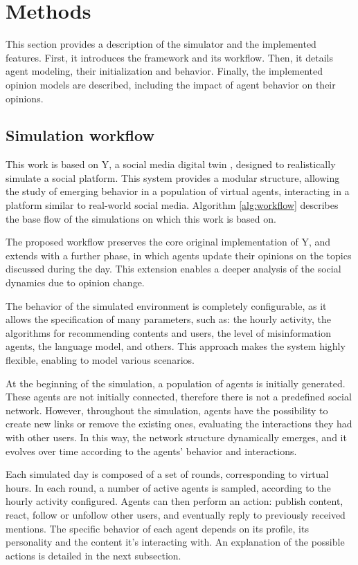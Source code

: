 \section{Methods}
\label{sec:methods}

This section provides a description of the simulator and the implemented features.
First, it introduces the framework and its workflow.
Then, it details agent modeling, their initialization and behavior.
Finally, the implemented opinion models are described, including the impact of agent behavior on their opinions.

\subsection{Simulation workflow}
This work is based on Y, a social media digital twin \cite{rossetti2024ysocialllmpoweredsocial}, designed to realistically simulate a social platform.
This system provides a modular structure, allowing the study of emerging behavior in a population of virtual agents, interacting in a platform similar to real-world social media.
Algorithm \ref{alg:workflow} describes the base flow of the simulations on which this work is based on.

\medskip
The proposed workflow preserves the core original implementation of Y, and extends with a further phase, in which agents update their opinions on the topics discussed during the day.
This extension enables a deeper analysis of the social dynamics due to opinion change.

The behavior of the simulated environment is completely configurable, as it allows the specification of many parameters, such as: the hourly activity, the algorithms for recommending contents and users, the level of misinformation agents, the language model, and others.
This approach makes the system highly flexible, enabling to model various scenarios.

\medskip
At the beginning of the simulation, a population of agents is initially generated.
These agents are not initially connected, therefore there is not a predefined social network.
However, throughout the simulation, agents have the possibility to create new links or remove the existing ones, evaluating the interactions they had with other users.
In this way, the network structure dynamically emerges, and it evolves over time according to the agents' behavior and interactions.


Each simulated day is composed of a set of rounds, corresponding to virtual hours.
In each round, a number of active agents is sampled, according to the hourly activity configured.
Agents can then perform an action: publish content, react, follow or unfollow other users, and eventually reply to previously received mentions.
The specific behavior of each agent depends on its profile, its personality and the content it's interacting with. 
An explanation of the possible actions is detailed in the next subsection.


